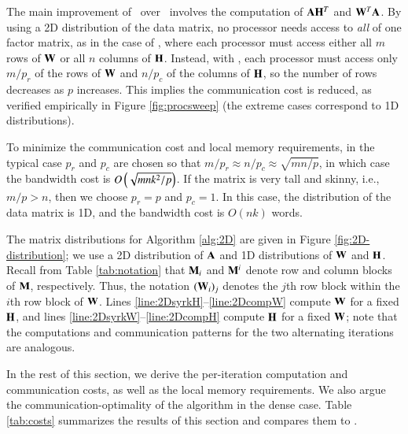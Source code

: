 The main improvement of \ParNMF\ over \Naive\ involves the computation of $\AA\HH^T$ and $\WW^T\AA$.
By using a 2D distribution of the data matrix, no processor needs access to \emph{all} of one factor matrix, as in the case of \Naive, where each processor must access either all $m$ rows of $\WW$ or all $n$ columns of $\HH$.
Instead, with \ParNMF, each processor must access only $m/p_r$ of the rows of $\WW$ and $n/p_c$ of the columns of $\HH$, so the number of rows decreases as $p$ increases.
This implies the communication cost is reduced, as verified empirically in Figure \ref{fig:procsweep} (the extreme cases correspond to 1D distributions).

To minimize the communication cost and local memory requirements, in the typical case $p_r$ and $p_c$ are chosen so that $m/p_r\approx n/p_c\approx \sqrt{mn/p}$, in which case the bandwidth cost is $O\lt(\sqrt{mnk^2/p}\rt)$.
If the matrix is very tall and skinny, i.e., $m/p>n$, then we choose $p_r=p$ and $p_c=1$.
In this case, the distribution of the data matrix is 1D, and the bandwidth cost is $O(nk)$ words.

The matrix distributions for Algorithm \ref{alg:2D} are given in Figure \ref{fig:2D-distribution}; we use a 2D distribution of $\AA$ and 1D distributions of $\WW$ and $\HH$.
Recall from Table \ref{tab:notation} that $\M{M}_i$ and $\M{M}^i$  denote row and column blocks of $\M{M}$, respectively.
Thus, the notation $(\WW_i)_j$ denotes the $j$th row block within the $i$th row block of $\WW$.
Lines \ref{line:2DsyrkH}--\ref{line:2DcompW} compute $\WW$ for a fixed $\HH$, and lines \ref{line:2DsyrkW}--\ref{line:2DcompH} compute $\HH$ for a fixed $\WW$; note that the computations and communication patterns for the two alternating iterations are analogous.

In the rest of this section, we derive the per-iteration computation and communication costs, as well as the local memory requirements.
We also argue the communication-optimality of the algorithm in the dense case.
Table \ref{tab:costs} summarizes the results of this section and compares them to \NaiveAlg.

